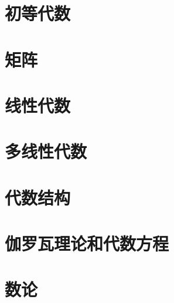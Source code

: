\chapter{初等代数}
\chapter{矩阵}
\chapter{线性代数}
\chapter{多线性代数}
\chapter{代数结构}
\chapter{伽罗瓦理论和代数方程}
\chapter{数论}